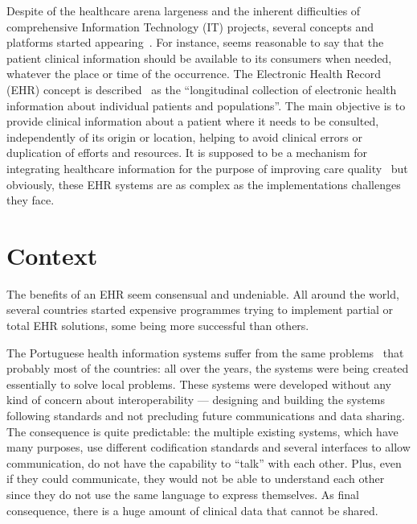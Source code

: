 Despite of the healthcare arena largeness and the inherent difficulties of comprehensive Information Technology (IT) projects, several concepts and platforms started appearing~\citep{Haux2006}. For instance, seems reasonable to say that the patient clinical information should be available to its consumers when needed, whatever the place or time of the occurrence. The Electronic Health Record (EHR) concept is described~\citep{Gunter2005} as the ``longitudinal collection of electronic health information about individual patients and populations''. The main objective is to provide clinical information about a patient where it needs to be consulted, independently of its origin or location, helping to avoid clinical errors or duplication of efforts and resources. It is supposed to be a mechanism for integrating healthcare information for the purpose of improving care quality~\citep{Orszag2008} but obviously, these EHR systems are as complex as the implementations challenges they face.

\section{Context} \label{sec:context}

The benefits of an EHR seem consensual and undeniable. All around the world, several countries started expensive programmes trying to implement partial or total EHR solutions, some being more successful than others.

The Portuguese health information systems suffer from the same problems~\citep{Deloitte2011} that probably most of the countries: all over the years, the systems were being created essentially to solve local problems. These systems were developed without any kind of concern about interoperability --- designing and building the systems following standards and not precluding future communications and data sharing. The consequence is quite predictable: the multiple existing systems, which have many purposes, use different codification standards and several interfaces to allow communication, do not have the capability to ``talk'' with each other. Plus, even if they could communicate, they would not be able to understand each other since they do not use the same language to express themselves. As final consequence, there is a huge amount of clinical data that cannot be shared.


